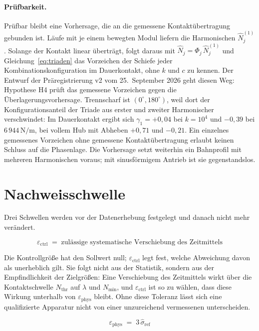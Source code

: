 \documentclass[12pt,a4paper]{report}
\begin{document}
\paragraph{Prüfbarkeit.}
Prüfbar bleibt eine Vorhersage, die an die gemessene Kontaktübertragung
gebunden ist. Läufe mit je einem bewegten Modul liefern die Harmonischen
$\hat{N}_j^{(1)}$. Solange der Kontakt linear überträgt, folgt daraus mit
$\hat{N}_j = \Phi_j\, \hat{N}_j^{(1)}$ und
Gleichung~\eqref{eq:triaden} das Vorzeichen der Schiefe jeder
Kombinationskonfiguration im Dauerkontakt, ohne $k$ und $c$ zu kennen.
Der Entwurf der Präregistrierung v2 vom 25.~September 2026 geht diesen
Weg: Hypothese H4 prüft das gemessene Vorzeichen gegen die
Überlagerungsvorhersage. Trennscharf ist $(0^\circ, 180^\circ)$, weil
dort der Konfigurationsanteil der Triade aus erster und zweiter
Harmonischer verschwindet: Im Dauerkontakt ergibt sich
$\gamma_1 = +0{,}04$ bei $k = 10^{4}$ und $-0{,}39$ bei
$6\,944\,\mathrm{N/m}$, bei vollem Hub mit Abheben $+0{,}71$ und
$-0{,}21$. Ein einzelnes gemessenes Vorzeichen ohne gemessene
Kontaktübertragung erlaubt keinen Schluss auf die Phasenlage. Die
Vorhersage setzt weiterhin ein Bahnprofil mit mehreren Harmonischen
voraus; mit sinusförmigem Antrieb ist sie gegenstandslos.

\section{Nachweisschwelle}
\label{sec:threshold}

Drei Schwellen werden vor der Datenerhebung festgelegt und danach nicht
mehr verändert.

\begin{equation}
  \varepsilon_{\mathrm{ctrl}} \;=\;
  \text{zulässige systematische Verschiebung des Zeitmittels}
  \label{eq:eps-ctrl}
\end{equation}

Die Kontrollgröße hat den Sollwert null; $\varepsilon_{\mathrm{ctrl}}$
legt fest, welche Abweichung davon als unerheblich gilt. Sie folgt nicht
aus der Statistik, sondern aus der Empfindlichkeit der Zielgrößen: Eine
Verschiebung des Zeitmittels wirkt über die Kontaktschwelle
$N_{\mathrm{thr}}$ auf $\lambda$ und $N_{\min}$, und
$\varepsilon_{\mathrm{ctrl}}$ ist so zu wählen, dass diese Wirkung
unterhalb von $\varepsilon_{\mathrm{phys}}$ bleibt. Ohne diese Toleranz
lässt sich eine qualifizierte Apparatur nicht von einer unzureichend
vermessenen unterscheiden.

\begin{equation}
  \varepsilon_{\mathrm{phys}} \;=\; 3\,\hat{\sigma}_{\mathrm{ref}}
  \label{eq:eps-phys}
\end{equation}
\end{document}
